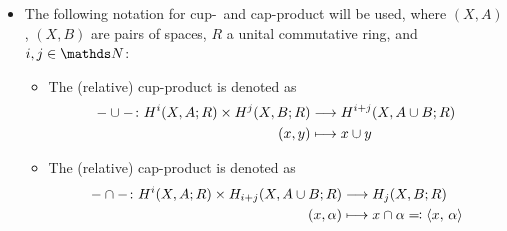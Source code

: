 \begin{itemize}
\begin{itemize}
  \end{itemize}
\item The following notation for cup-~and cap-product will be used,
  where $(X,A)$, $(X,B)$ are pairs of spaces, $R$ a unital commutative
  ring, and $i,j\in\Nat$:
  \begin{itemize}
  \item The (relative) cup-product is denoted as
    \begin{align*}
      -\cup-\colon
      H^i(X,A;R)\times H^j(X,B;R) &\longrightarrow H^{i+j}(X,A\cup B;R)\\
      (x, y) &\longmapsto x\cup y
    \end{align*}
  \item The (relative) cap-product is denoted as
    \begin{align*}
      -\cap-\colon
      H^i(X,A;R)\times H_{i+j}(X,A\cup B;R) &\longrightarrow H_j(X,B;R)\\
      (x, \alpha) &\longmapsto x\cap \alpha \eqqcolon \left\langle x,\, \alpha \right\rangle
    \end{align*}
  \end{itemize}
\end{itemize}




  